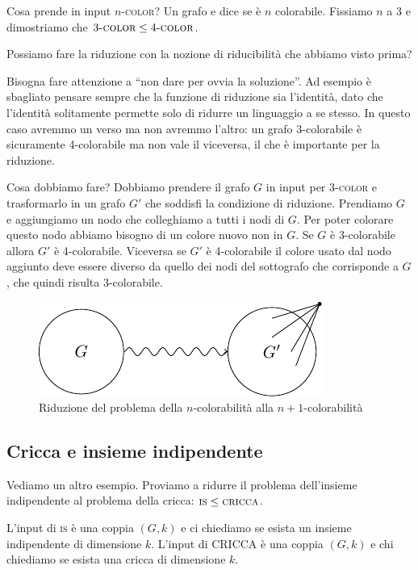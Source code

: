 Cosa prende in input $n$\textsc{-color}? Un grafo e dice se è $n$ colorabile. Fissiamo $n$ a 3 e dimostriamo
che $3\textsc{-color} \leq 4\textsc{-color}$.

Possiamo fare la riduzione con la nozione di riducibilità che abbiamo visto prima?

Bisogna fare attenzione a ``non dare per ovvia la soluzione''. Ad esempio è sbagliato pensare
sempre che la funzione di riduzione sia l'identità, dato che l'identità solitamente permette solo
di ridurre un linguaggio a se stesso. In questo caso avremmo un verso ma non avremmo l'altro: un
grafo 3-colorabile è sicuramente 4-colorabile ma non vale il viceversa, il che è importante per la
riduzione.

Cosa dobbiamo fare? Dobbiamo prendere il grafo $G$ in input per 3\textsc{-color} e trasformarlo in
un grafo $G'$ che soddisfi la condizione di riduzione. Prendiamo $G$ e aggiungiamo un nodo che
colleghiamo a tutti i nodi di $G$. Per poter colorare questo nodo abbiamo bisogno di un colore nuovo
non in $G$.  Se $G$ è 3-colorabile allora $G'$ è 4-colorabile. Viceversa se $G'$ è 4-colorabile
il colore usato dal nodo aggiunto deve essere diverso da quello dei nodi del sottografo che
corrisponde a $G$, che quindi risulta 3-colorabile.

\begin{figure}[h]
    \begin{center}
        \includegraphics{img/3COL4COL.pdf}
    \end{center}
    \caption{Riduzione del problema della $n$-colorabilità alla $n+1$-colorabilità}
\end{figure}

\subsection{Cricca e insieme indipendente}

Vediamo un altro esempio. Proviamo a ridurre il problema dell'insieme indipendente al problema della
cricca: $\textsc{is} \leq \textsc{cricca}$.

L'input di \textsc{is} è una coppia $(G,k)$ e ci chiediamo se esista un insieme indipendente di
dimensione $k$. L'input di CRICCA è una coppia $(G,k)$ e chi chiediamo se esista una cricca di
dimensione $k$.

